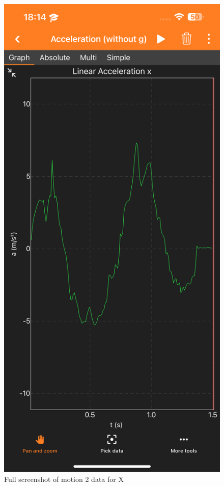 \documentclass[idxtotoc,hyperref,openany]{labbook} %
\begin{document}
\begin{figure}[H] %
\begin{center}
\includegraphics[width=.55\linewidth]{images/Lab.03/Lab03Motion2X.PNG}
\end{center}
\caption{Full screenshot of motion 2 data for X}
\label{fig:Lab03-Motion2-X}
\end{figure}
\end{document}
